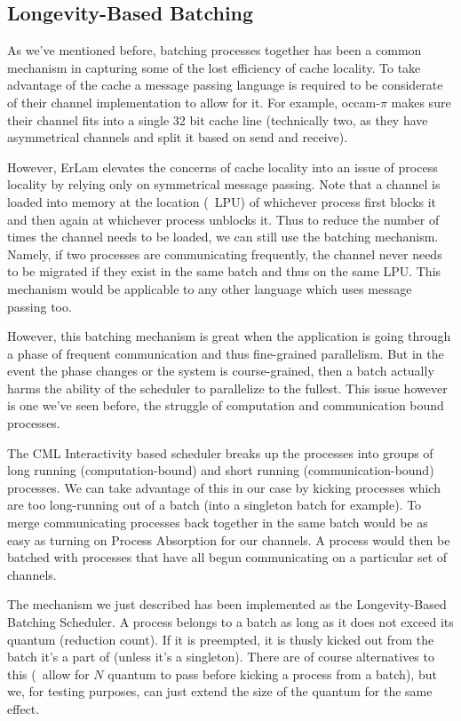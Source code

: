 \subsection{Longevity-Based Batching}\label{sec:longevity based batching}

As we've mentioned before, batching processes together has been a common 
mechanism in capturing some of the lost efficiency of cache locality. To take
advantage of the cache a message passing language is required to be considerate 
of their channel implementation to allow for it. For example, occam-$\pi$ makes sure
their channel fits into a single 32 bit cache line (technically two, as they
have asymmetrical channels and split it based on send and receive).

However, ErLam elevates the concerns of cache locality into an issue of process 
locality by relying only on symmetrical message passing. Note that 
a channel is loaded into memory at the location (\ie~LPU) of whichever process 
first blocks it and then again at whichever process unblocks it. Thus to reduce
the number of times the channel needs to be loaded, we can still use the 
batching mechanism. Namely, if two processes are communicating frequently, the
channel never needs to be migrated if they exist in the same batch and thus on the
same LPU. This mechanism would be applicable to any other language which uses 
message passing too.

However, this batching mechanism is great when the application is going through
a phase of frequent communication and thus fine-grained parallelism. But in the
event the phase changes or the system is course-grained, then a batch actually
harms the ability of the scheduler to parallelize to the fullest. This issue 
however is one we've seen before, the struggle of computation and communication
bound processes.

The CML Interactivity based scheduler breaks up the processes into groups of
long running (computation-bound) and short running (communication-bound)
processes. We can take advantage of this in our case by kicking processes which
are too long-running out of a batch (into a singleton batch for example). To 
merge communicating processes back together in the same batch would be as easy
as turning on Process Absorption for our channels. A process would then be
batched with processes that have all begun communicating on a particular set
of channels.

The mechanism we just described has been implemented as the Longevity-Based
Batching Scheduler. A process belongs to a batch as long as it does not exceed
its quantum (reduction count). If it is preempted, it is thusly kicked out 
from the batch it's a part of (unless it's a singleton). There are of course
alternatives to this (\eg~allow for $N$ quantum to pass before kicking a 
process from a batch), but we, for testing purposes, can just extend the size
of the quantum for the same effect.

